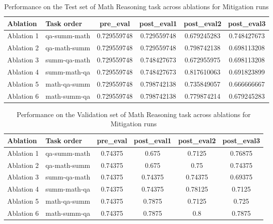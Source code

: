 \begin{table}[!ht]
    \centering
    \caption{Performance on the Test set of Math Reasoning task across ablations for Mitigation runs}
    \begin{tabular}{|l|l|S[table-format=2.4]|S[table-format=2.4]|S[table-format=2.4]|S[table-format=2.4]|}
    \hline
        \textbf{Ablation} & \textbf{Task order} & \textbf{pre\_eval} & \textbf{post\_eval1} & \textbf{post\_eval2} & \textbf{post\_eval3 } \\ \hline
        Ablation 1 & qa-summ-math & 0.729559748 & 0.729559748 & 0.679245283 & 0.748427673  \\ 
        Ablation 2 & qa-math-summ & 0.729559748 & 0.729559748 & 0.798742138 & 0.698113208  \\ 
        Ablation 3 & summ-qa-math & 0.729559748 & 0.748427673 & 0.672955975 & 0.698113208  \\ 
        Ablation 4 & summ-math-qa & 0.729559748 & 0.748427673 & 0.817610063 & 0.691823899  \\ 
        Ablation 5 & math-qa-summ & 0.729559748 & 0.798742138 & 0.735849057 & 0.666666667  \\ 
        Ablation 6 & math-summ-qa & 0.729559748 & 0.798742138 & 0.779874214 & 0.679245283  \\ \hline
    \end{tabular}
    \label{tab:MathTestMitigation}
\end{table}

\begin{table}[!ht]
    \centering
    \caption{Performance on the Validation set of Math Reasoning task across ablations for Mitigation runs}
    \begin{tabular}{|l|l|S[table-format=2.4]|S[table-format=2.4]|S[table-format=2.4]|S[table-format=2.4]|}
    \hline
        \textbf{Ablation} & \textbf{Task order} & \textbf{pre\_eval} & \textbf{post\_eval1} & \textbf{post\_eval2} & \textbf{post\_eval3 } \\ \hline
        Ablation 1 & qa-summ-math & 0.74375 & 0.675 & 0.7125 & 0.76875  \\ 
        Ablation 2 & qa-math-summ & 0.74375 & 0.675 & 0.75 & 0.74375  \\ 
        Ablation 3 & summ-qa-math & 0.74375 & 0.74375 & 0.74375 & 0.69375  \\ 
        Ablation 4 & summ-math-qa & 0.74375 & 0.74375 & 0.78125 & 0.7125  \\ 
        Ablation 5 & math-qa-summ & 0.74375 & 0.7875 & 0.7125 & 0.725  \\ 
        Ablation 6 & math-summ-qa & 0.74375 & 0.7875 & 0.8 & 0.7875  \\ \hline
    \end{tabular}
    \label{tab:MathValMitigation}
\end{table}